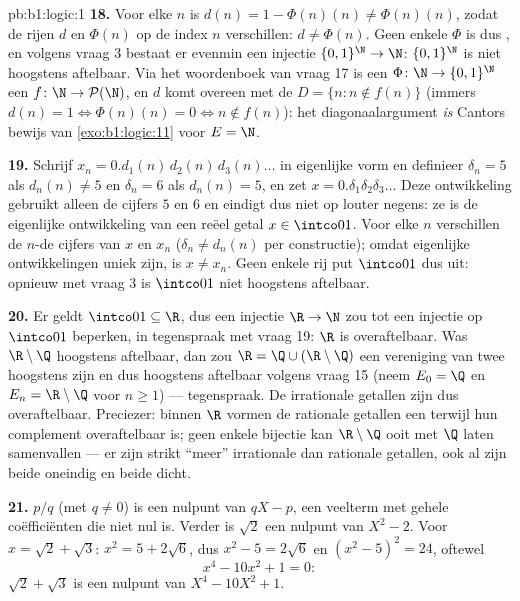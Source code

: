 \begin{solution}{pb:b1:logic:1}
\textbf{18.} Voor elke $n$ is $d(n) = 1 - \Phi(n)(n) \neq \Phi(n)(n)$,
zodat de rijen $d$ en $\Phi(n)$ op de index $n$ verschillen: $d \neq
\Phi(n)$. Geen enkele $\Phi$ is dus , en volgens vraag 3
bestaat er evenmin een injectie $\{0,1\}^{\N} \to \N$: $\{0,1\}^{\N}$ is
niet hoogstens aftelbaar. Via het woordenboek van vraag 17 is een
 $\Phi \colon \N \to \{0,1\}^{\N}$ een  $f \colon \N
\to \mathcal{P}(\N)$, en $d$ komt overeen met de  $D = \{n : n
\notin f(n)\}$ (immers $d(n) = 1 \iff \Phi(n)(n) = 0 \iff n \notin
f(n)$): het diagonaalargument \emph{is} Cantors bewijs van
\cref{exo:b1:logic:11} voor $E = \N$.

\textbf{19.} Schrijf $x_n = 0.d_1(n)\,d_2(n)\,d_3(n)\dots$ in eigenlijke
vorm en definieer $\delta_n = 5$ als $d_n(n) \neq 5$ en $\delta_n = 6$
als $d_n(n) = 5$, en zet $x = 0.\delta_1\delta_2\delta_3\dots$ Deze
ontwikkeling gebruikt alleen de cijfers $5$ en $6$ en eindigt dus niet op
louter negens: ze is de eigenlijke ontwikkeling van een reëel getal $x
\in \intco01$. Voor elke $n$ verschillen de $n$-de cijfers van $x$ en
$x_n$ ($\delta_n \neq d_n(n)$ per constructie); omdat eigenlijke
ontwikkelingen uniek zijn, is $x \neq x_n$. Geen enkele rij put $\intco01$
dus uit: opnieuw met vraag 3 is $\intco01$ niet hoogstens aftelbaar.

\textbf{20.} Er geldt $\intco01 \subseteq \R$, dus een injectie $\R \to
\N$ zou tot een injectie op $\intco01$ beperken, in tegenspraak met vraag
19: $\R$ is overaftelbaar. Was $\R \setminus \Q$ hoogstens aftelbaar, dan
zou $\R = \Q \cup (\R \setminus \Q)$ een vereniging van twee hoogstens
 zijn en dus hoogstens aftelbaar volgens vraag 15
(neem $E_0 = \Q$ en $E_n = \R \setminus \Q$ voor $n \geq 1$) ---
tegenspraak. De irrationale getallen zijn dus overaftelbaar. Preciezer:
binnen $\R$ vormen de rationale getallen een 
terwijl hun complement overaftelbaar is; geen enkele bijectie kan $\R
\setminus \Q$ ooit met $\Q$ laten samenvallen --- er zijn strikt ``meer''
irrationale dan rationale getallen, ook al zijn beide oneindig en beide
dicht.

\textbf{21.} $p/q$ (met $q \neq 0$) is een nulpunt van $qX - p$, een
veelterm met gehele coëfficiënten die niet nul is. Verder is $\sqrt 2$
een nulpunt van $X^2 - 2$. Voor $x = \sqrt 2 + \sqrt 3$: $x^2 = 5 +
2\sqrt 6$, dus $x^2 - 5 = 2\sqrt 6$ en $(x^2 - 5)^2 = 24$, oftewel
\[
x^4 - 10x^2 + 1 = 0 :
\]
$\sqrt 2 + \sqrt 3$ is een nulpunt van $X^4 - 10X^2 + 1$.


\end{solution}
